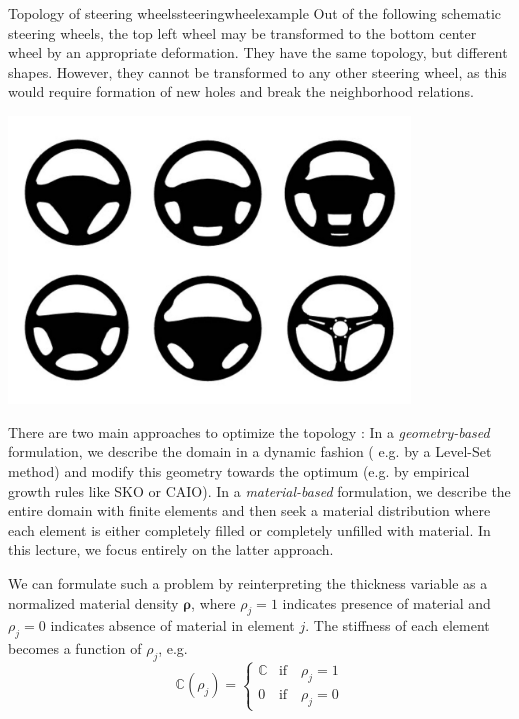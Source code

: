 \begin{example}{Topology of steering wheels}{steeringwheelexample}
    Out of the following schematic steering wheels, the top left wheel may be transformed to the bottom center wheel by an appropriate deformation. They have the same topology, but different shapes. However, they cannot be transformed to any other steering wheel, as this would require formation of new holes and break the neighborhood relations. 
    \begin{center}
        \includegraphics[width=0.8\textwidth]{figures/steeringwheels.png}
    \end{center}
\end{example}

There are two main approaches to optimize the topology \cite{Eschenauer2001}: In a \emph{geometry-based} formulation, we describe the domain in a dynamic fashion ( e.g. by a Level-Set method) and modify this geometry towards the optimum (e.g. by empirical growth rules like SKO or CAIO).
In a \emph{material-based} formulation, we describe the entire domain with finite elements and then seek a material distribution where each element is either completely filled or completely unfilled with material. In this lecture, we focus entirely on the latter approach.

We can formulate such a problem by reinterpreting the thickness variable as a normalized material density $\pmb{\rho}$, where $\rho_j=1$ indicates presence of material and $\rho_j=0$ indicates absence of material in element $j$. The stiffness of each element becomes a function of $\rho_j$, e.g. 
\begin{equation}
    \mathbb{C}(\rho_j)=
    \begin{cases}
        \mathbb{C} & \text{if} \quad \rho_j = 1 \\
        0          & \text{if} \quad \rho_j = 0
    \end{cases}
\end{equation}

